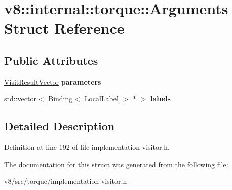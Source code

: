 \hypertarget{structv8_1_1internal_1_1torque_1_1Arguments}{}\section{v8\+:\+:internal\+:\+:torque\+:\+:Arguments Struct Reference}
\label{structv8_1_1internal_1_1torque_1_1Arguments}
\subsection*{Public Attributes}
\begin{DoxyCompactItemize}
\item 
\mbox{\label{structv8_1_1internal_1_1torque_1_1Arguments_a97908a9a6a473ef92d55ff02e803c4ee}} 
\mbox{\hyperlink{classv8_1_1internal_1_1torque_1_1VisitResultVector}{Visit\+Result\+Vector}} {\bfseries parameters}
\item 
\mbox{\label{structv8_1_1internal_1_1torque_1_1Arguments_af47d48972f6b027ff46fbbe36bb4a4bf}} 
std\+::vector$<$ \mbox{\hyperlink{classv8_1_1internal_1_1torque_1_1Binding}{Binding}}$<$ \mbox{\hyperlink{structv8_1_1internal_1_1torque_1_1LocalLabel}{Local\+Label}} $>$ $\ast$ $>$ {\bfseries labels}
\end{DoxyCompactItemize}


\subsection{Detailed Description}


Definition at line 192 of file implementation-\/visitor.\+h.



The documentation for this struct was generated from the following file\+:\begin{DoxyCompactItemize}
\item 
v8/src/torque/implementation-\/visitor.\+h\end{DoxyCompactItemize}
